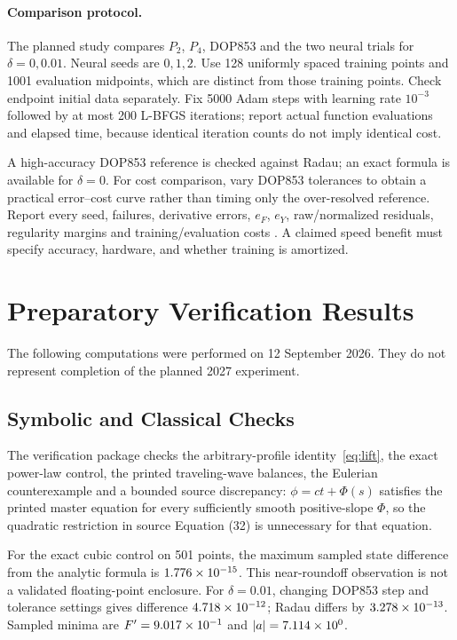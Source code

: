 \documentclass[11pt,a4paper]{article}
\theoremstyle{definition}
\theoremstyle{remark}
\begin{document}
\paragraph{Comparison protocol.}
The planned study compares $P_2$, $P_4$, DOP853 and the two neural trials for $\delta=0,0.01$. Neural seeds are $0,1,2$. Use 128 uniformly spaced training points and 1001 evaluation midpoints, which are distinct from those training points. Check endpoint initial data separately. Fix 5000 Adam steps with learning rate $10^{-3}$ followed by at most 200 L-BFGS iterations; report actual function evaluations and elapsed time, because identical iteration counts do not imply identical cost.

A high-accuracy DOP853 reference is checked against Radau; an exact formula is available for $\delta=0$. For cost comparison, vary DOP853 tolerances to obtain a practical error--cost curve rather than timing only the over-resolved reference. Report every seed, failures, derivative errors, $e_F$, $e_Y$, raw/normalized residuals, regularity margins and training/evaluation costs \cite{baselines}. A claimed speed benefit must specify accuracy, hardware, and whether training is amortized.

\section{Preparatory Verification Results}\label{sec:results}
The following computations were performed on 12 September 2026. They do not represent completion of the planned 2027 experiment.

\subsection{Symbolic and Classical Checks}
The verification package checks the arbitrary-profile identity~\eqref{eq:lift}, the exact power-law control, the printed traveling-wave balances, the Eulerian counterexample and a bounded source discrepancy: $\phi=ct+\Phi(s)$ satisfies the printed master equation for every sufficiently smooth positive-slope $\Phi$, so the quadratic restriction in source Equation (32) is unnecessary for that equation.

For the exact cubic control on 501 points, the maximum sampled state difference from the analytic formula is $1.776\times10^{-15}$. This near-roundoff observation is not a validated floating-point enclosure. For $\delta=0.01$, changing DOP853 step and tolerance settings gives difference $4.718\times10^{-12}$; Radau differs by $3.278\times10^{-13}$. Sampled minima are $F'=9.017\times10^{-1}$ and $|a|=7.114\times10^{0}$.
\end{document}
